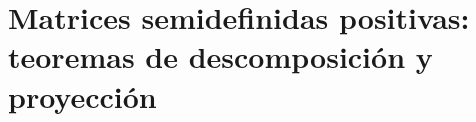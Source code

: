 \begin{comment}
Para concluir la sección, es interesante destacar algunas propiedades topológicas de las que disponen algunos de los subconjuntos más destacados de matrices con el producto escalar que hemos añadido.

\begin{prop}~
    En las siguientes propiedades suponemos fijada una dimensión $d' \times d$ (con $d' = d$ cuando la propiedad esté definida solo en espacios de matrices cuadradas).
    \begin{enumerate}
        \item Las aplicaciones traza y determinante son continuas.
        \item La suma, el producto y la trasposición de matrices son continuos.
        \item El conjunto de todas las matrices es un espacio vectorial. Las matrices simétricas (resp. antisimétricas) forman un subespacio vectorial del espacio de matrices cuadradas. En consecuencia, son convexos y por tanto conexos.
        \item El conjunto de las matrices regulares (o isomorfismos vectoriales) es abierto y tiene dos componentes conexas: los isomorfismos que preservan la orientación (determinante positivo) y los que la invierten (determinante negativo).
        \item El grupo ortogonal (o grupo de isometrías) tiene también dos componentes conexas: las isometrías que preservan la orientación, y las que la invierten. Además, es compacto.
    \end{enumerate}
\end{prop}

\begin{proof}~
    \begin{enumerate}
        \item Ambas aplicaciones son polinomios en las entradas de la matriz.
        \item Cada componente de las funciones es un polinomio en las entradas de las matrices que reciben como argumento.
        \item La comprobación de que son espacios vectoriales es inmediata. Son convexos por serlo todos los subespacios vectoriales.
    \end{enumerate}
\end{proof}
\end{comment}

\section{Matrices semidefinidas positivas: teoremas de descomposición y proyección}

